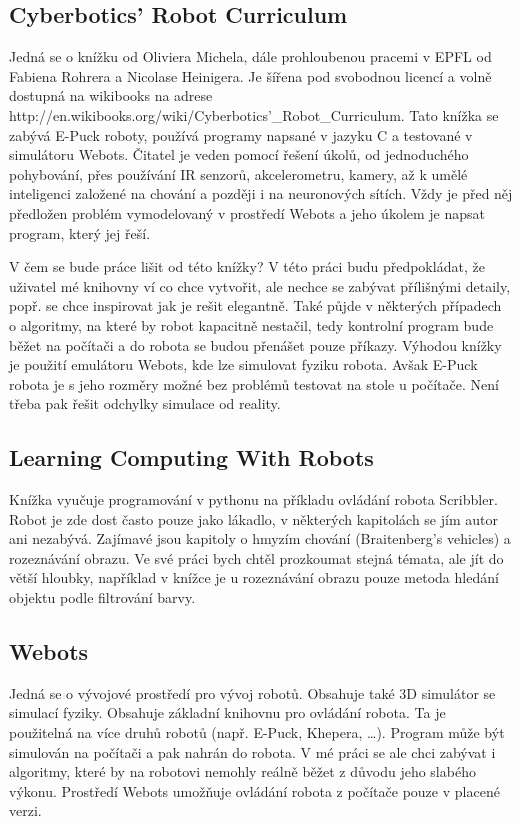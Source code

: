 \documentclass[11pt]{article}
\begin{document}
\subsection{Cyberbotics' Robot Curriculum}

Jedná se o knížku od Oliviera Michela, dále prohloubenou pracemi v EPFL od
Fabiena Rohrera a Nicolase Heinigera. Je šířena pod svobodnou licencí a volně
dostupná na wikibooks na adrese
http://en.wikibooks.org/wiki/Cyberbotics'\_Robot\_Curriculum. Tato knížka se
zabývá E-Puck roboty, používá programy napsané v jazyku C a testované v
simulátoru Webots. Čitatel je veden pomocí řešení úkolů, od jednoduchého
pohybování, přes používání IR senzorů, akcelerometru, kamery, až k umělé
inteligenci založené na chování a později i na neuronových sítích. Vždy je před
něj předložen problém vymodelovaný v prostředí Webots a jeho úkolem je napsat
program, který jej řeší.

V čem se bude práce lišit od této knížky? V této práci budu předpokládat, že
uživatel mé knihovny ví co chce vytvořit, ale nechce se zabývat přílišnými
detaily, popř. se chce inspirovat jak je rešit elegantně. Také půjde v
některých případech o algoritmy, na které by robot kapacitně nestačil, tedy
kontrolní program bude běžet na počítači a do robota se budou přenášet pouze
příkazy. Výhodou knížky je použití emulátoru Webots, kde lze simulovat fyziku
robota. Avšak E-Puck robota je s jeho rozměry možné bez problémů testovat na
stole u počítače. Není třeba pak řešit odchylky simulace od reality.

\subsection{Learning Computing With Robots}

Knížka vyučuje programování v pythonu na příkladu ovládání robota Scribbler.
Robot je zde dost často pouze jako lákadlo, v některých kapitolách se jím autor
ani nezabývá. Zajímavé jsou kapitoly o hmyzím chování (Braitenberg's vehicles)
a rozeznávání obrazu. Ve své práci bych chtěl prozkoumat stejná témata, ale jít
do větší hloubky, například v knížce je u rozeznávání obrazu pouze metoda
hledání objektu podle filtrování barvy.

\subsection{Webots}

Jedná se o vývojové prostředí pro vývoj robotů. Obsahuje také 3D simulátor se
simulací fyziky. Obsahuje základní knihovnu pro ovládání robota. Ta je
použitelná na více druhů robotů (např. E-Puck, Khepera, \ldots). Program může
být simulován na počítači a pak nahrán do robota. V mé práci se ale chci
zabývat i algoritmy, které by na robotovi nemohly reálně běžet z důvodu jeho
slabého výkonu. Prostředí Webots umožňuje ovládání robota z počítače pouze v
placené verzi.
\end{document}
